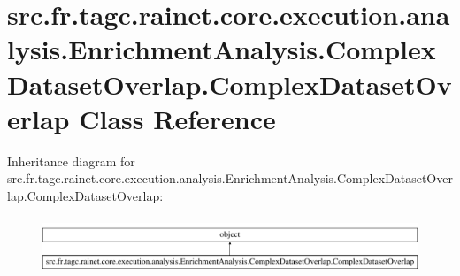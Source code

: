 \hypertarget{classsrc_1_1fr_1_1tagc_1_1rainet_1_1core_1_1execution_1_1analysis_1_1EnrichmentAnalysis_1_1Comple500f6ec22a9a1e615c8c425ff66b262}{\section{src.\-fr.\-tagc.\-rainet.\-core.\-execution.\-analysis.\-Enrichment\-Analysis.\-Complex\-Dataset\-Overlap.\-Complex\-Dataset\-Overlap Class Reference}
\label{classsrc_1_1fr_1_1tagc_1_1rainet_1_1core_1_1execution_1_1analysis_1_1EnrichmentAnalysis_1_1Comple500f6ec22a9a1e615c8c425ff66b262}
}
Inheritance diagram for src.\-fr.\-tagc.\-rainet.\-core.\-execution.\-analysis.\-Enrichment\-Analysis.\-Complex\-Dataset\-Overlap.\-Complex\-Dataset\-Overlap\-:\begin{figure}[H]
\begin{center}
\leavevmode
\includegraphics[height=1.728395cm]{classsrc_1_1fr_1_1tagc_1_1rainet_1_1core_1_1execution_1_1analysis_1_1EnrichmentAnalysis_1_1Comple500f6ec22a9a1e615c8c425ff66b262}
\end{center}
\end{figure}

